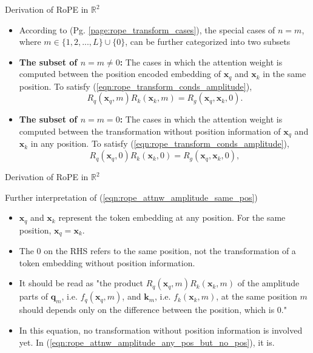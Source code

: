 \documentclass{beamer}
\begin{document}
	\begin{frame}{Derivation of RoPE in $\mathbb{R}^2$}		
		\begin{itemize}
			\item According to (Pg. \ref{page:rope_transform_cases}), the special cases of $n=m$, where $m \in \{1,2,...,L\} \cup \{0\}$, can be further categorized into two subsets
			\item \textbf{The subset of $n=m\neq 0$:} The cases in which the attention weight is computed between the position encoded embedding of $\mathbf{x}_q$ and $\mathbf{x}_k$ in the same position. To satisfy (\ref{eqn:rope_transform_conds_amplitude}), 
			\begin{equation} \label{eqn:rope_attnw_amplitude_same_pos}
				R_q(\mathbf{x}_q, m)R_k(\mathbf{x}_k, m) = R_g(\mathbf{x}_q, \mathbf{x}_k, 0).
			\end{equation}							
			\item \textbf{The subset of $n=m=0$:} The cases in which the attention weight is computed between the transformation without position information of $\mathbf{x}_q$ and $\mathbf{x}_k$ in any position. To satisfy (\ref{eqn:rope_transform_conds_amplitude}), 
			\begin{equation} \label{eqn:rope_attnw_amplitude_any_pos_but_no_pos}
				R_q(\mathbf{x}_q, 0)R_k(\mathbf{x}_k, 0) = R_g(\mathbf{x}_q, \mathbf{x}_k, 0),
			\end{equation}
		\end{itemize}
	\end{frame}	
	
	\begin{frame}{Derivation of RoPE in $\mathbb{R}^2$}
		\begin{block}{Further interpretation of (\ref{eqn:rope_attnw_amplitude_same_pos})}
			\begin{itemize}		
				\item $\mathbf{x}_q$ and $\mathbf{x}_k$ represent the token embedding at any position. For the same position, $\mathbf{x}_q=\mathbf{x}_k$.
				\item The $0$ on the RHS refers to the same position, not the transformation of a token embedding without position information.				
				\item It should be read as "the product $R_q(\mathbf{x}_q, m)R_k(\mathbf{x}_k, m)$ of the amplitude parts of $\mathbf{q}_m$, i.e. $f_q(\mathbf{x}_q, m)$, and $\mathbf{k}_m$, i.e. $f_k(\mathbf{x}_k, m)$, at the same position $m$ should depends only on the difference between the position, which is $0$." 
				\item In this equation, no transformation without position information is involved yet. In (\ref{eqn:rope_attnw_amplitude_any_pos_but_no_pos}), it is. %
			\end{itemize}
		\end{block}			
	\end{frame}
	
\end{document}
